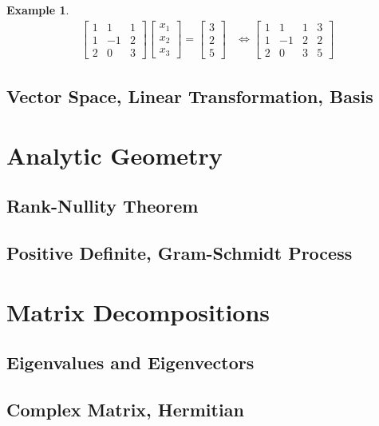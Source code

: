 \documentclass[12pt,openany]{book}
\theoremstyle{definition}
\newtheorem{example}{Example}[chapter]
\begin{document}
	\begin{example}
		\begin{align*}
		\begin{bmatrix}
		1 & 1 & 1\\ 1 & -1& 2\\ 2 & 0 & 3
		\end{bmatrix}\begin{bmatrix}
		x_1\\ x_2\\ x_3
		\end{bmatrix}=\begin{bmatrix}
		3 \\ 2 \\ 5
		\end{bmatrix} &\iff \left[
		\begin{array}{ccc|c}
		1 & 1 & 1 & 3\\
		1 & -1 & 2 & 2\\
		2 & 0 & 3 & 5
		\end{array}
		\right]
		\end{align*}
	\end{example}
	
	\section{Vector Space, Linear Transformation, Basis}
	
	\chapter{Analytic Geometry}
	\section{Rank-Nullity Theorem}
	\section{Positive Definite, Gram-Schmidt Process}
	
	\chapter{Matrix Decompositions}
	\section{Eigenvalues and Eigenvectors}
	\section{Complex Matrix, Hermitian}
\end{document}
